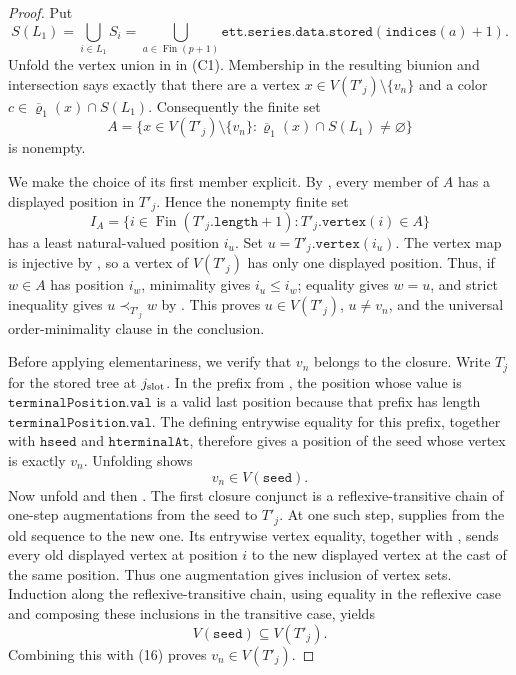 \begin{proof}
Put
\[
 S(L_1)=\bigcup_{i\in L_1}S_i
 =\bigcup_{a\in\operatorname{Fin}(p+1)}
       \mathtt{ett.series.data.stored}(\mathtt{indices}(a)+1).
\]
Unfold the vertex union in  in (C1).  Membership
in the resulting biunion and intersection says exactly that there are a
vertex \(x\in V(T'_j)\setminus\{v_n\}\) and a color
\(c\in\overline\varrho_1(x)\cap S(L_1)\).  Consequently the finite set
\[
 A=\{x\in V(T'_j)\setminus\{v_n\}:
          \overline\varrho_1(x)\cap S(L_1)\ne\varnothing\}
\]
is nonempty.

We make the choice of its first member explicit.  By
, every member of \(A\) has a displayed
position in \(T'_j\).  Hence the nonempty finite set
\[
 I_A=\{i\in\operatorname{Fin}(T'_j.\mathtt{length}+1):
                      T'_j.\mathtt{vertex}(i)\in A\}
\]
has a least natural-valued position \(i_u\).  Set
\(u=T'_j.\mathtt{vertex}(i_u)\).  The vertex map is injective by
, so a vertex of \(V(T'_j)\) has only one displayed
position.  Thus, if \(w\in A\) has position \(i_w\), minimality gives
\(i_u\leq i_w\); equality gives \(w=u\), and strict inequality gives
\(u\prec_{T'_j}w\) by .  This proves
\(u\in V(T'_j)\), \(u\ne v_n\), and the universal order-minimality
clause in the conclusion.

Before applying elementariness, we verify that \(v_n\) belongs to the
closure.  Write \(T_j\) for the stored tree at \(j_{\rm slot}\).  In the
prefix from , the position whose value is
\(\mathtt{terminalPosition.val}\) is a valid last position because that
prefix has length \(\mathtt{terminalPosition.val}\).  The defining
entrywise equality for this prefix, together with \(\mathtt{hseed}\) and
\(\mathtt{hterminalAt}\), therefore gives a position of the seed whose
vertex is exactly \(v_n\).  Unfolding 
shows
\[
                         v_n\in V(\mathtt{seed}).             \tag{16}
\]
Now unfold  and then
.  The first closure conjunct is a
reflexive-transitive chain of one-step augmentations from the seed to
\(T'_j\).  At one such step,  supplies
 from the old sequence to the new one.
Its entrywise vertex equality, together with
, sends every old displayed vertex at
position \(i\) to the new displayed vertex at the cast of the same
position.  Thus one augmentation gives inclusion of vertex sets.  Induction
along the reflexive-transitive chain, using equality in the reflexive case
and composing these inclusions in the transitive case, yields
\[
                    V(\mathtt{seed})\subseteq V(T'_j).
\]
Combining this with (16) proves \(v_n\in V(T'_j)\).


\end{proof}
